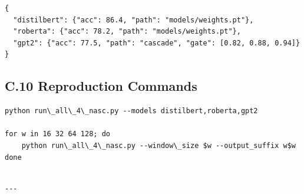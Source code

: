 \begin{lstlisting}
{
  "distilbert": {"acc": 86.4, "path": "models/weights.pt"},
  "roberta": {"acc": 78.2, "path": "models/weights.pt"},
  "gpt2": {"acc": 77.5, "path": "cascade", "gate": [0.82, 0.88, 0.94]}
}
\end{lstlisting}

\subsection{C.10 Reproduction Commands}

\begin{lstlisting}
python run\_all\_4\_nasc.py --models distilbert,roberta,gpt2

for w in 16 32 64 128; do
    python run\_all\_4\_nasc.py --window\_size $w --output_suffix w$w
done
\end{lstlisting}
\begin{lstlisting}

---
\end{lstlisting}